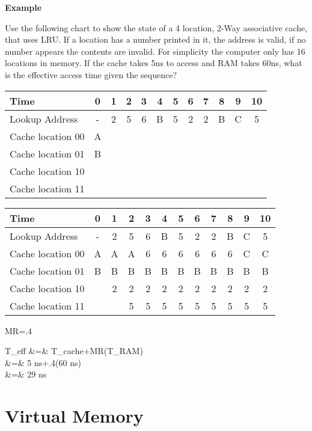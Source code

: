 \vspace{.1in}\noindent
\textbf{Example}


Use the following chart to show the state of a 4 location, 2-Way associative cache, that uses LRU.  If a location has a number printed in it, the address is valid, if no number appears the contents are invalid.  For simplicity the computer only has 16 locations in memory.  If the cache takes 5ns to access and RAM takes 60ns, what is the effective access time given the sequence?

\begin{tabular}{|l|c|c|c|c|c|c|c|c|c|c|c|} \hline
Time              & 0 & 1 & 2 & 3 & 4 & 5 & 6 & 7 & 8 & 9 & 10 \\ \hline
Lookup Address    & - & 2 & 5 & 6 & B & 5 & 2 & 2 & B & C & 5  \\ \hline
Cache location 00 & A &   &   &   &   &   &   &   &   &   &    \\ \hline
Cache location 01 & B &   &   &   &   &   &   &   &   &   &    \\ \hline
Cache location 10 &   &   &   &   &   &   &   &   &   &   &    \\ \hline
Cache location 11 &   &   &   &   &   &   &   &   &   &   &    \\ \hline
\end{tabular}

{\color{ans}
\begin{tabular}{|l|c|c|c|c|c|c|c|c|c|c|c|} \hline
Time              & 0 & 1 & 2 & 3 & 4 & 5 & 6 & 7 & 8 & 9 & 10 \\ \hline
Lookup Address    & - & 2 & 5 & 6 & B & 5 & 2 & 2 & B & C & 5  \\ \hline
Cache location 00 & A & A & A & 6 & 6 & 6 & 6 & 6 & 6 & C & C  \\ \hline
Cache location 01 & B & B & B & B & B & B & B & B & B & B & B  \\ \hline
Cache location 10 &   & 2 & 2 & 2 & 2 & 2 & 2 & 2 & 2 & 2 & 2  \\ \hline
Cache location 11 &   &   & 5 & 5 & 5 & 5 & 5 & 5 & 5 & 5 & 5  \\ \hline
\end{tabular}

MR=.4

\beqn
T_{eff}
 &=& T_{cache}+MR(T_{RAM}) \\
 &=& 5 ns+.4(60 ns) \\
 &=& 29 ns
\eeqn
}



\section{Virtual Memory}


